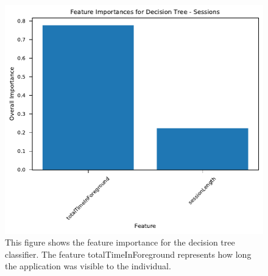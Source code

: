 \documentclass{l4proj}
\begin{document}
\begin{figure}[htb]
    \centering
    \includegraphics[width=0.70\linewidth]{images/sessions/feature_importance_DecisionTreeSessions.pdf}
    \caption{This figure shows the feature importance for the decision tree classifier. The feature totalTimeInForeground represents how long the application was visible to the individual.}
    \label{fig:session_feature_importance_dtree} 
\end{figure}
\end{document}
